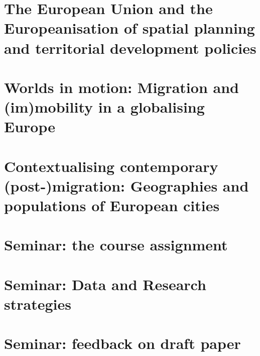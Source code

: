 \documentclass{article}
\begin{document}
\section{The European Union and the Europeanisation of spatial planning and territorial development policies}
\date{November 9th, 2021}


\section{Worlds in motion: Migration and (im)mobility in a globalising Europe}
\date{November 22nd, 2021}


\section{Contextualising contemporary (post-)migration: Geographies and populations of European cities}
\date{November 29th, 2021}


\section{Seminar: the course assignment}
\date{October 11th, 2021}


\section{Seminar: Data and Research strategies}
\date{October 26th, 2021}




\section{Seminar: feedback on draft paper}
\date{December 13th, 2021}
\end{document}

